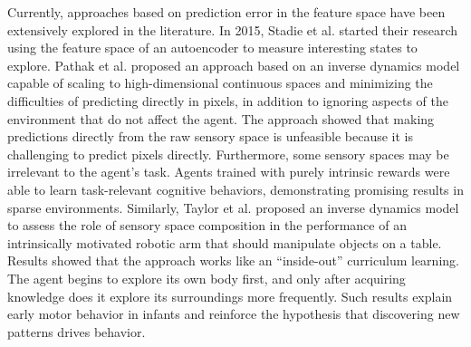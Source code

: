 
Currently, approaches based on prediction error in the feature space have been extensively explored in the literature. In 2015, Stadie et al. \cite{stadie2015incentivizing} started their research using the feature space of an autoencoder to measure interesting states to explore. Pathak et al. \cite{pathak2017curiosity} proposed an approach based on an inverse dynamics model capable of scaling to high-dimensional continuous spaces and minimizing the difficulties of predicting directly in pixels, in addition to ignoring aspects of the environment that do not affect the agent. The approach showed that making predictions directly from the raw sensory space is unfeasible because it is challenging to predict pixels directly. Furthermore, some sensory spaces may be irrelevant to the agent's task. Agents trained with purely intrinsic rewards were able to learn task-relevant cognitive behaviors, demonstrating promising results in sparse environments. Similarly, Taylor et al. proposed an inverse dynamics model to assess the role of sensory space composition in the performance of an intrinsically motivated robotic arm that should manipulate objects on a table. Results showed that the approach works like an ``inside-out'' curriculum learning. The agent begins to explore its own body first, and only after acquiring knowledge does it explore its surroundings more frequently. Such results explain early motor behavior in infants and reinforce the hypothesis that discovering new patterns drives behavior.


